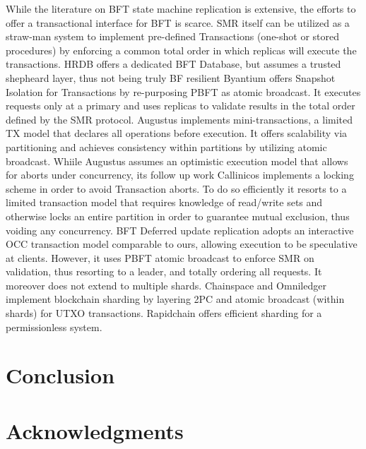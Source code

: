 While the literature on BFT state machine replication is extensive, the efforts to offer a transactional interface for BFT is scarce. SMR itself can be utilized as a straw-man system to implement pre-defined Transactions (one-shot or stored procedures) by enforcing a common total order  in which replicas will execute the transactions. 
HRDB offers a dedicated BFT Database, but assumes a trusted shepheard layer, thus not being truly BF resilient
Byantium offers Snapshot Isolation for Transactions by re-purposing PBFT as atomic broadcast. It executes requests only at a primary and uses replicas to validate results in the total order defined by the SMR protocol. Augustus implements mini-transactions, a limited TX model that declares all operations before execution. It offers scalability via partitioning and achieves consistency within partitions by utilizing atomic broadcast. Whiile Augustus assumes an optimistic execution model that allows for aborts under concurrency, its follow up work Callinicos implements a locking scheme in order to avoid Transaction aborts. To do so efficiently it resorts to a limited transaction model that requires knowledge of read/write sets and otherwise locks an entire partition in order to guarantee mutual exclusion, thus voiding any concurrency. BFT Deferred update replication adopts an interactive OCC transaction model comparable to ours, allowing execution to be speculative at clients. However, it uses PBFT atomic broadcast to enforce SMR on validation, thus resorting to a leader, and totally ordering all requests. It moreover does not extend to multiple shards.
Chainspace and Omniledger implement blockchain sharding by layering 2PC and atomic broadcast (within shards) for UTXO transactions. Rapidchain offers efficient sharding for a permissionless system. 

\cite{kotla2007zyzzyva}

\section{Conclusion}


\section*{Acknowledgments}

